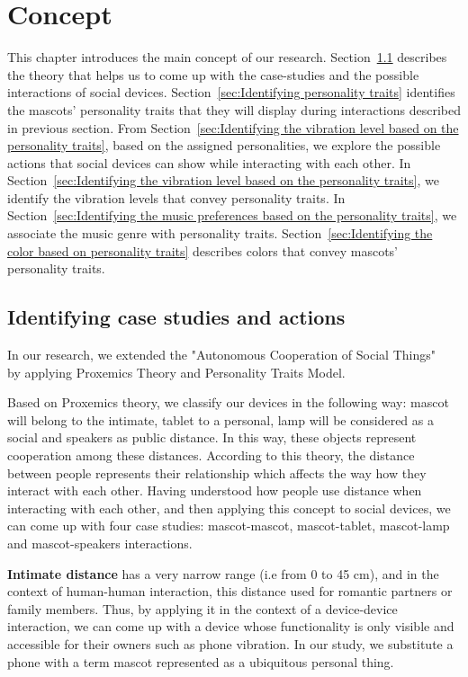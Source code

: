 \chapter{Concept}
\label{ch:concept}

This chapter introduces the main concept of our research.
Section~\ref{sec:Identifying case studies and actions} describes the theory that helps us
to come up with the case-studies and the possible interactions of social devices.
Section~\ref{sec:Identifying personality traits} identifies the mascots' personality traits
that they will display during interactions described in previous section.
From Section~\ref{sec:Identifying the vibration level based on the personality traits},
based on the assigned personalities, we explore the possible actions that social devices
can show while interacting with each other.
In Section~\ref{sec:Identifying the vibration level based on the personality traits},
we identify the vibration levels that convey personality traits.
In Section~\ref{sec:Identifying the music preferences based on the personality traits},
we associate the music genre with personality traits.
Section~\ref{sec:Identifying the color based on personality traits} describes
colors that convey mascots' personality traits.

\section{Identifying case studies and actions}
\label{sec:Identifying case studies and actions}

In our research, we extended the "Autonomous Cooperation of Social Things" ~\cite{okada2016autonomous}
by applying Proxemics Theory and Personality Traits Model.

Based on Proxemics theory, we classify our devices in the following way:
mascot will belong to the intimate, tablet to a personal,
lamp will be considered as a social and speakers as public distance.
In this way, these objects represent cooperation among these distances.
According to this theory, the distance between people represents their
relationship which affects the way how they interact with each other.
Having understood how people use distance when interacting with each other,
and then applying this concept to social devices, we can come up with four case studies:
mascot-mascot, mascot-tablet, mascot-lamp and mascot-speakers interactions.

\textbf{Intimate distance} has a very narrow range (i.e from 0 to 45 cm),
and in the context of human-human interaction, this distance used for romantic partners or family members.
Thus, by applying it in the context of a device-device interaction, we can come up with
a device whose functionality is only visible and accessible for their owners such as phone vibration.
In our study, we substitute a phone with a term mascot represented as a ubiquitous personal thing.

